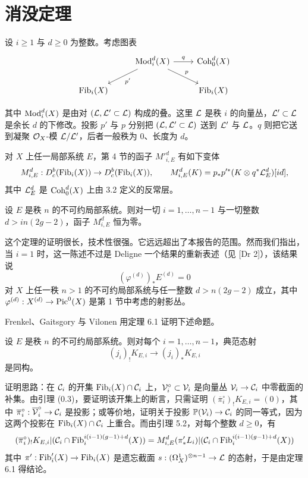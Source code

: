\section{消没定理}

设 $i\ge 1$ 与 $d\ge 0$ 为整数。考虑图表
\[
\begin{tikzcd}
 & \Mod^d_i(X) \arrow[dl,"p'"] \arrow[r,"q"] \arrow[dr,"p"] & \Coh^d_0(X) \\
\Fib_i(X) & & \Fib_i(X)
\end{tikzcd}
\]

其中 $\operatorname{Mod}^d_i(X)$ 是由对 $(\mathcal{L},\mathcal{L}'\subset\mathcal{L})$ 构成的叠。这里 $\mathcal{L}$ 是秩 $i$ 的向量丛，$\mathcal{L}'\subset\mathcal{L}$ 是余长 $d$ 的下修改。投影 $p'$ 与 $p$ 分别把 $(\mathcal{L},\mathcal{L}'\subset\mathcal{L})$ 送到 $\mathcal{L}'$ 与 $\mathcal{L}$。$q$ 则把它送到凝聚 $\mathcal{O}_X$-模 $\mathcal{L}/\mathcal{L}'$，后者一般秩为 $0$、长度为 $d$。

对 $X$ 上任一局部系统 $E$，第 4 节的函子 $M'^d_{i,E}$ 有如下变体
\[
M^d_{i,E}:D^{b}_{c}(\operatorname{Fib}_i(X))\to D^{b}_{c}(\operatorname{Fib}_i(X)),\qquad
M^d_{i,E}(K)=p_*p'^*(K\otimes q^*\mathcal{L}^d_E)[id],
\]
其中 $\mathcal{L}^d_E$ 是 $\operatorname{Coh}^d_0(X)$ 上由 3.2 定义的反常层。

\begin{theorem}[Gaitsgory, {[Ga]}]
设 $E$ 是秩 $n$ 的不可约局部系统。则对一切 $i=1,\dots,n-1$ 与一切整数 $d>in(2g-2)$，函子 $M^d_{i,E}$ 恒为零。
\end{theorem}

\begin{remark}
这个定理的证明很长，技术性很强。它远远超出了本报告的范围。然而我们指出，当 $i=1$ 时，这一陈述不过是 Deligne 一个结果的重新表述（见 [Dr 2]），该结果说
\[
(\varphi^{(d)})_*E^{(d)}=0
\]
对 $X$ 上任一秩 $n>1$ 的不可约局部系统与任一整数 $d>n(2g-2)$ 成立，其中 $\varphi^{(d)}:X^{(d)}\to\operatorname{Pic}^0(X)$ 是第 1 节中考虑的射影丛。
\end{remark}

Frenkel、Gaitsgory 与 Vilonen 用定理 6.1 证明下述命题。

\begin{proposition}
设 $E$ 是秩 $n$ 的不可约局部系统。则对每个 $i=1,\dots,n-1$，典范态射
\[
(j_i)_!K_{E,i}\to(j_i)_*K_{E,i}
\]
是同构。
\end{proposition}

证明思路：在 $\mathcal{C}_i$ 的开集 $\operatorname{Fib}_i(X)\cap\mathcal{C}_i$ 上，$\mathcal{V}^\circ_i\subset\mathcal{V}_i$ 是向量丛 $\mathcal{V}_i\to\mathcal{C}_i$ 中零截面的补集。由引理 (0.3)，要证明该开集上的断言，只需证明 $(\overline{\pi}^\circ_i)_!K_{E,i}=(0)$，其中 $\overline{\pi}^\circ_i:\overline{\mathcal{V}}^\circ_i\to\mathcal{C}_i$ 是投影；或等价地，证明关于投影 $\mathbb{P}(\mathcal{V}_i)\to\mathcal{C}_i$ 的同一等式，因为这两个投影在 $\operatorname{Fib}_i(X)\cap\mathcal{C}_i$ 上重合。而由引理 5.2，对每个整数 $d\ge 0$，有
\[
(\overline{\pi}^\circ_i)_!K_{E,i}|(\mathcal{C}_i\cap\operatorname{Fib}_i^{i(i-1)(g-1)+d}(X))
=M^d_{i,E}(\pi'_*L_i)|(\mathcal{C}_i\cap\operatorname{Fib}_i^{i(i-1)(g-1)+d}(X))
\]
其中 $\pi':\operatorname{Fib}'_i(X)\to\operatorname{Fib}_i(X)$ 是遗忘截面 $s:(\Omega^{1}_{X})^{\otimes n-1}\to\mathcal{L}$ 的态射，于是由定理 6.1 得结论。

